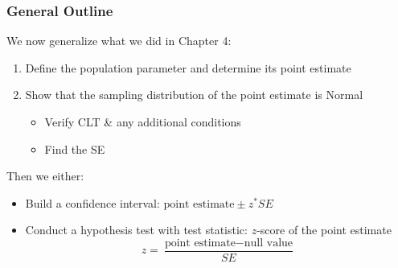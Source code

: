 \documentclass[handout]{beamer}
\begin{document}
\begin{frame}[fragile]
\frametitle{General Outline}
%
%
We now generalize what we did in Chapter 4:
\begin{enumerate}
\pause\item Define the population parameter and determine its point estimate
\pause\item Show that the sampling distribution of the point estimate is Normal
\begin{itemize}
\item Verify CLT \& any additional conditions
\item Find the SE
\end{itemize}
\end{enumerate}

\vspace{0.25cm}

Then we either:
\begin{itemize}
\pause\item Build a confidence interval:  $\mbox{point estimate} \pm z^* SE$
\pause\item Conduct a hypothesis test with test statistic:  $z$-score of the point estimate
\[
z=\frac{\mbox{point estimate} - \mbox{null value}}{SE}
\]
\end{itemize}

\end{frame}
\end{document}
